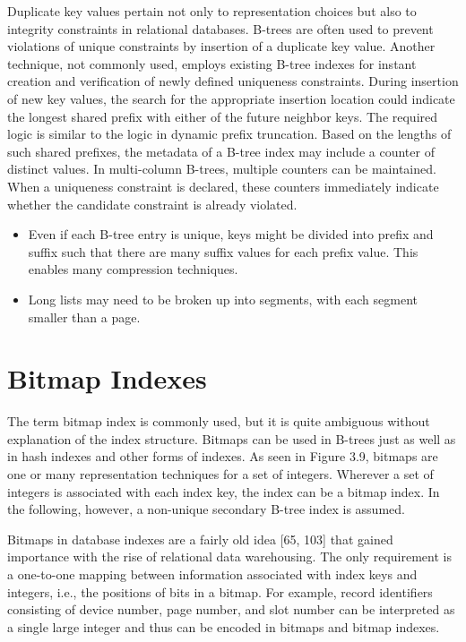 Duplicate key values pertain not only to representation choices but also
to integrity constraints in relational databases. B-trees are often used
to prevent violations of unique constraints by insertion of a duplicate
key value. Another technique, not commonly used, employs existing B-tree
indexes for instant creation and verification of newly defined
uniqueness constraints. During insertion of new key values, the search
for the appropriate insertion location could indicate the longest shared
prefix with either of the future neighbor keys. The required logic is
similar to the logic in dynamic prefix truncation. Based on the lengths
of such shared prefixes, the metadata of a B-tree index may include a
counter of distinct values. In multi-column B-trees, multiple counters
can be maintained. When a uniqueness constraint is declared, these
counters immediately indicate whether the candidate constraint is
already violated.

\begin{itemize}
\item
  Even if each B-tree entry is unique, keys might be divided into prefix
  and suffix such that there are many suffix values for each prefix
  value. This enables many compression techniques.
\item
  Long lists may need to be broken up into segments, with each segment
  smaller than a page.
\end{itemize}

\hypertarget{bitmap-indexes}{%
\section{Bitmap Indexes}\label{bitmap-indexes}}

The term bitmap index is commonly used, but it is quite ambiguous
without explanation of the index structure. Bitmaps can be used in
B-trees just as well as in hash indexes and other forms of indexes. As
seen in Figure 3.9, bitmaps are one or many representation techniques
for a set of integers. Wherever a set of integers is associated with
each index key, the index can be a bitmap index. In the following,
however, a non-unique secondary B-tree index is assumed.

Bitmaps in database indexes are a fairly old idea {[}65, 103{]} that
gained importance with the rise of relational data warehousing. The only
requirement is a one-to-one mapping between information associated with
index keys and integers, i.e., the positions of bits in a bitmap. For
example, record identifiers consisting of device number, page number,
and slot number can be interpreted as a single large integer and thus
can be encoded in bitmaps and bitmap indexes.

